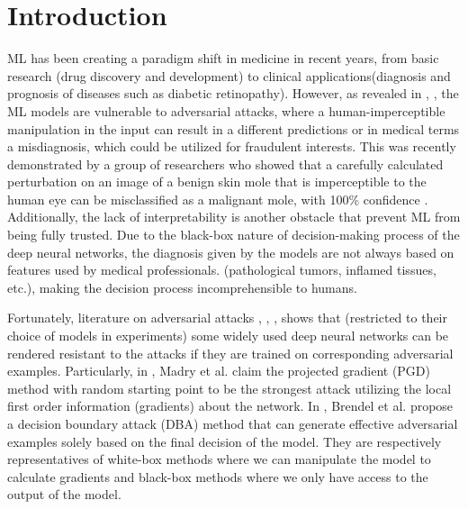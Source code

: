 \documentclass[../main.tex]{subfiles}
\begin{document}
\section{Introduction}
\label{sec:introduction}
\label{subsec:formal_statement}


ML has been creating a paradigm shift in medicine in recent years, from basic research (drug discovery and development) to clinical applications(diagnosis and prognosis of diseases such as diabetic retinopathy)\cite{noauthor_ascent_2019}. However, as revealed in \cite{adv1}, \cite{adv2}, the ML models are vulnerable to adversarial attacks, where a human-imperceptible manipulation in the input can result in a different predictions or in medical terms a misdiagnosis, which could be utilized for fraudulent interests. This was recently demonstrated by a group of researchers who showed that a carefully calculated perturbation on an image of a benign skin mole that is imperceptible to the human eye can be misclassified as a malignant mole, with 100\% confidence \cite{finlayson_adversarial_2019}. Additionally, the lack of interpretability is another obstacle that prevent ML from being fully trusted. Due to the black-box nature of decision-making process of the deep neural networks, the diagnosis given by the models are not always based on features used by medical professionals. (pathological tumors, inflamed tissues, etc.), making the decision process incomprehensible to humans.

Fortunately, literature on adversarial attacks \cite{kurakin_adversarial_2016}, \cite{fgsm}, \cite{brendel_decision-based_2017}, \cite{madry_towards_2017} shows that (restricted to their choice of models in experiments) some widely used deep neural networks can be rendered resistant to the attacks if they are trained on corresponding adversarial examples. Particularly, in \cite{madry_towards_2017}, Madry et al. claim the projected gradient (PGD) method with random starting point to be the strongest attack utilizing the local first order information (gradients) about the network. In \cite{brendel_decision-based_2017}, Brendel et al. propose a decision boundary attack (DBA) method that can generate effective adversarial examples solely based on the final decision of the model. They are respectively representatives of white-box methods where we can manipulate the model to calculate gradients and black-box methods where we only have access to the output of the model. 
\end{document}
